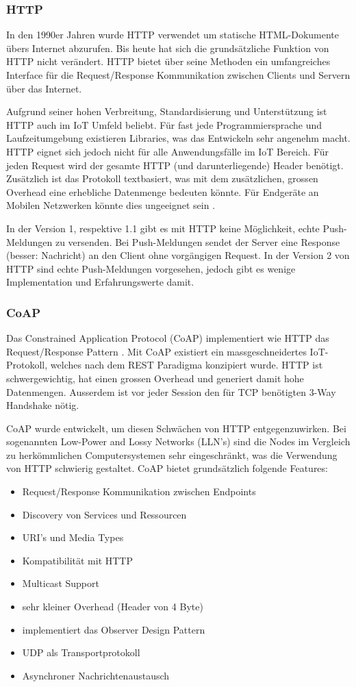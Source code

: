 \subsubsection{HTTP}
In den 1990er Jahren wurde HTTP verwendet um statische HTML-Dokumente übers Internet abzurufen. Bis heute hat sich die grundsätzliche Funktion von HTTP nicht verändert. HTTP bietet über seine Methoden ein umfangreiches Interface für die Request/Response Kommunikation zwischen Clients und Servern über das Internet. 

Aufgrund seiner hohen Verbreitung, Standardisierung und Unterstützung ist HTTP auch im IoT Umfeld beliebt. Für fast jede Programmiersprache und Laufzeitumgebung existieren Libraries, was das Entwickeln sehr angenehm macht. HTTP eignet sich jedoch nicht für alle Anwendungsfälle im IoT Bereich. Für jeden Request wird der gesamte HTTP (und darunterliegende) Header benötigt. Zusätzlich ist das Protokoll textbasiert, was mit dem zusätzlichen, grossen Overhead eine erhebliche Datenmenge bedeuten könnte. Für Endgeräte an Mobilen Netzwerken könnte dies ungeeignet sein \cite{Obermaier15}.

In der Version 1, respektive 1.1 gibt es mit HTTP keine Möglichkeit, echte Push-Meldungen zu versenden. Bei Push-Meldungen sendet der Server eine Response (besser: Nachricht) an den Client ohne vorgängigen Request. In der Version 2 von HTTP sind echte Push-Meldungen vorgesehen, jedoch gibt es wenige Implementation und Erfahrungswerte damit.
\subsubsection{CoAP}
Das Constrained Application Protocol (CoAP) implementiert wie HTTP das Request/Response Pattern \cite{Obermaier15}. Mit CoAP existiert ein massgeschneidertes IoT-Protokoll, welches nach dem REST Paradigma konzipiert wurde. HTTP ist schwergewichtig, hat einen grossen Overhead und generiert damit hohe Datenmengen. Ausserdem ist vor jeder Session den für TCP benötigten 3-Way Handshake nötig. 

CoAP wurde entwickelt, um diesen Schwächen von HTTP entgegenzuwirken. Bei sogenannten Low-Power and Lossy Networks (LLN's) sind die Nodes im Vergleich zu herkömmlichen Computersystemen sehr eingeschränkt, was die Verwendung von HTTP schwierig gestaltet. CoAP bietet grundsätzlich folgende Features:\cite{RFC7252}
\begin{itemize}
\item Request/Response Kommunikation zwischen Endpoints	
\item Discovery von Services und Ressourcen
\item URI's und Media Types
\item Kompatibilität mit HTTP
\item Multicast Support
\item sehr kleiner Overhead (Header von 4 Byte)
\item implementiert das Observer Design Pattern
\item UDP als Transportprotokoll
\item Asynchroner Nachrichtenaustausch
\end{itemize}

